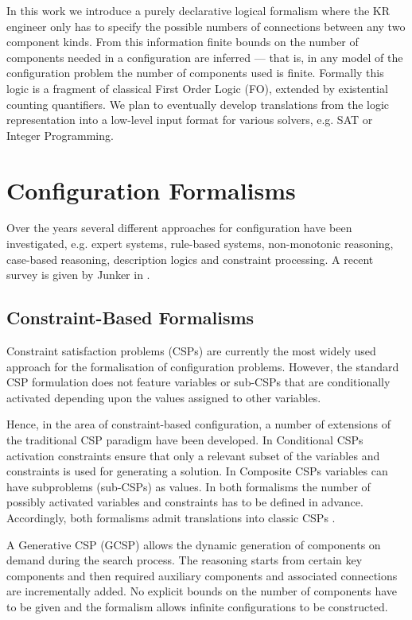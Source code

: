 \documentclass[copyright,creativecommons]{eptcs}
\begin{document}
In this work we introduce a purely declarative logical formalism where the KR engineer only has to specify the possible numbers of connections between any two component kinds.
From this information finite bounds on the number of components needed in a configuration are inferred ---
that is, in any model of the configuration problem the number of components used is finite.
Formally this logic is a fragment of classical First Order Logic (FO), extended by existential counting quantifiers.
We plan to eventually develop translations from the logic representation into a low-level input format for various solvers, e.g. SAT or Integer Programming.

\section{Configuration Formalisms}

Over the years several different approaches for configuration have been investigated, e.g. expert systems, rule-based systems, non-monotonic reasoning, case-based reasoning, 
description logics and constraint processing. 
A recent survey is given by Junker in \cite{junker:configuration}. 

\subsection{Constraint-Based Formalisms}

Constraint satisfaction problems (CSPs) are currently the most widely used approach for the formalisation of configuration problems. 
However, the standard CSP formulation does not feature variables or sub-CSPs that are conditionally activated depending upon the values assigned to other variables.

Hence, in the area of constraint-based configuration, a number of extensions of the traditional CSP paradigm have been developed.
In Conditional CSPs \cite{mittal:dcsp} activation constraints ensure that only a relevant subset of the variables and constraints is used for generating a solution.
In Composite CSPs \cite{sabin:composite} variables can have subproblems (sub-CSPs) as values. 
In both formalisms the number of possibly activated variables and constraints has to be defined in advance. 
Accordingly, both formalisms admit translations into classic CSPs \cite{thorstensen:capturing}. 

A Generative CSP (GCSP) \cite{stumptner:generative} allows the dynamic generation of components on demand during the search process. 
The reasoning starts from certain key components and then required auxiliary components and associated connections are incrementally added. 
No explicit bounds on the number of components have to be given and the formalism allows infinite configurations to be constructed.
\end{document}
